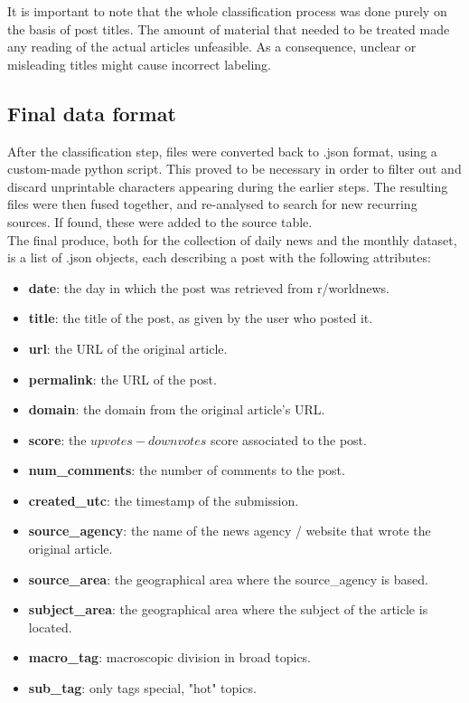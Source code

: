 \documentclass{article}
\begin{document}
It is important to note that the whole classification process was done purely on the basis of post titles. The amount of material that needed to be treated made any reading of the actual articles unfeasible. As a consequence, unclear or misleading titles might cause incorrect labeling.

\subsection{Final data format}
After the classification step, files were converted back to .json format, using a custom-made python script. This proved to be necessary in order to filter out and discard unprintable characters appearing during the earlier steps.  The resulting files were then fused together, and re-analysed to search for new recurring sources. If found, these were added to the source table.\\
The final produce, both for the collection of daily news and the monthly dataset, is a list of .json objects, each describing a post with the following attributes:
\begin{itemize}
\item \textbf{date}: the day in which the post was retrieved from r/worldnews.
\item \textbf{title}: the title of the post, as given by the user who posted it.
\item \textbf{url}: the URL of the original article.
\item \textbf{permalink}: the URL of the post.
\item \textbf{domain}: the domain from the original article's URL.
\item \textbf{score}: the \(upvotes-downvotes\) score associated to the post.
\item \textbf{num\_comments}: the number of comments to the post.
\item \textbf{created\_utc}: the timestamp of the submission.
\item \textbf{source\_agency}: the name of the news agency / website that wrote the original article.
\item \textbf{source\_area}: the geographical area where the source\_agency is based.
\item \textbf{subject\_area}: the geographical area where the subject of the article is located.
\item \textbf{macro\_tag}: macroscopic division in broad topics.
\item \textbf{sub\_tag}: only tags special, "hot" topics.
\end{itemize}
\end{document}
